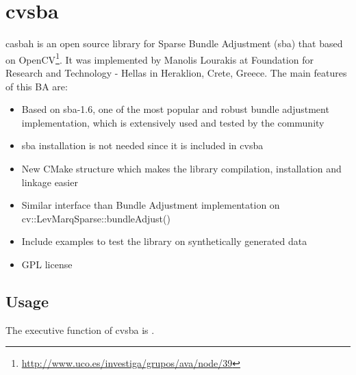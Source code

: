 \section{cvsba}
casbah is an open source library for Sparse Bundle Adjustment (sba) that based on OpenCV\footnote{\url{http://www.uco.es/investiga/grupos/ava/node/39}}. It was implemented by Manolis Lourakis at Foundation for Research and Technology - Hellas in Heraklion, Crete, Greece. The main features of this BA are:
\begin{itemize}
\item Based on sba-1.6, one of the most popular and robust bundle adjustment implementation, which is extensively used and tested by the community
\item sba installation is not needed since it is included in cvsba
\item New CMake structure which makes the library compilation, installation and linkage easier
\item Similar interface than Bundle Adjustment implementation on cv::LevMarqSparse::bundleAdjust()
\item Include examples to test the library on synthetically generated data
\item GPL license
\end{itemize}

\subsection{Usage}
The executive function of cvsba is . 

